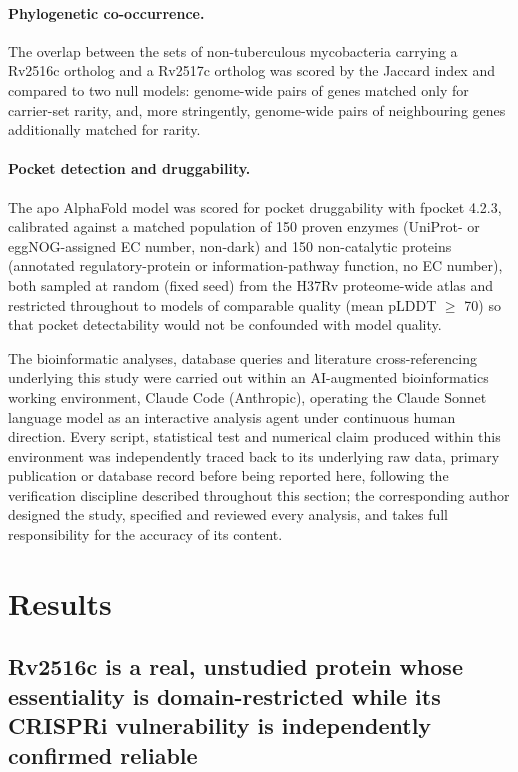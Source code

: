 \documentclass[11pt,a4paper]{article}
\begin{document}
\paragraph{Phylogenetic co-occurrence.} The overlap between the sets of non-tuberculous mycobacteria
carrying a Rv2516c ortholog and a Rv2517c ortholog was scored by the Jaccard index and compared to
two null models: genome-wide pairs of genes matched only for carrier-set rarity, and, more
stringently, genome-wide pairs of neighbouring genes additionally matched for rarity.

\paragraph{Pocket detection and druggability.} The apo AlphaFold model was scored for pocket
druggability with fpocket 4.2.3, calibrated against a matched population of 150 proven enzymes
(UniProt- or eggNOG-assigned EC number, non-dark) and 150 non-catalytic proteins (annotated
regulatory-protein or information-pathway function, no EC number), both sampled at random (fixed
seed) from the H37Rv proteome-wide atlas and restricted throughout to models of comparable quality
(mean pLDDT $\geq$ 70) so that pocket detectability would not be confounded with model quality.

The bioinformatic analyses, database queries and literature cross-referencing underlying this
study were carried out within an AI-augmented bioinformatics working environment, Claude Code
(Anthropic), operating the Claude Sonnet language model as an interactive analysis agent under
continuous human direction. Every script, statistical test and numerical claim produced within
this environment was independently traced back to its underlying raw data, primary publication or
database record before being reported here, following the verification discipline described
throughout this section; the corresponding author designed the study, specified and reviewed every
analysis, and takes full responsibility for the accuracy of its content.

\section{Results}

\subsection{Rv2516c is a real, unstudied protein whose essentiality is domain-restricted while its
CRISPRi vulnerability is independently confirmed reliable}
\end{document}
